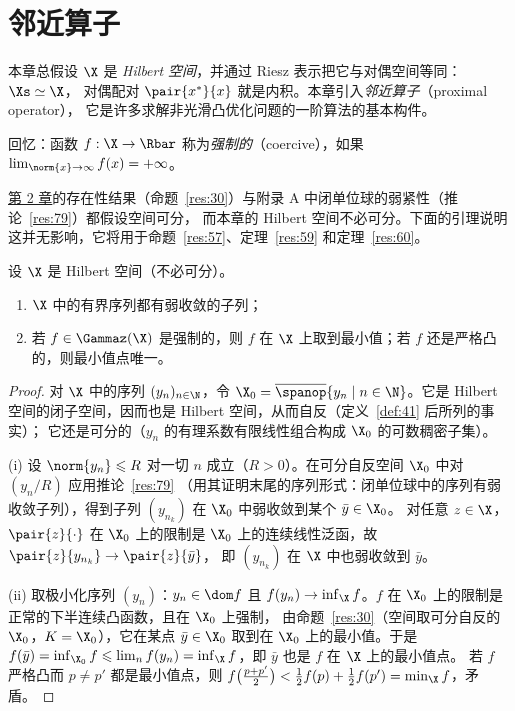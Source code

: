 \chapter{邻近算子}
\label{ch:ch04}
\providecommand{\Fix}{\operatorname{Fix}}

本章总假设 $\X$ 是 \emph{Hilbert 空间}，并通过 Riesz 表示把它与对偶空间等同：$\Xs\simeq\X$，
对偶配对 $\pair{x^*}{x}$ 就是内积。本章引入\emph{邻近算子}（proximal operator），
它是许多求解非光滑凸优化问题的一阶算法的基本构件。

回忆：函数 $f:\X\to\Rbar$ 称为\emph{强制的}（coercive），如果 $\lim_{\norm{x}\to\infty}f(x)=+\infty$。

\hyperref[ch:ch02]{第 2 章}的存在性结果（命题~\ref{res:30}）与附录 A 中闭单位球的弱紧性（推论~\ref{res:79}）都假设空间可分，
而本章的 Hilbert 空间不必可分。下面的引理说明这并无影响，它将用于命题~\ref{res:57}、定理~\ref{res:59} 和定理~\ref{res:60}。

\begin{lemma}
\label{new:ch04-nonsep}
设 $\X$ 是 Hilbert 空间（不必可分）。
\begin{enumerate}[label=(\roman*)]
  \item $\X$ 中的有界序列都有弱收敛的子列；
  \item 若 $f\in\Gammaz(\X)$ 是强制的，则 $f$ 在 $\X$ 上取到最小值；若 $f$ 还是严格凸的，则最小值点唯一。
\end{enumerate}
\end{lemma}

\begin{proof}
对 $\X$ 中的序列 $(y_n)_{n\in\N}$，令 $\X_0=\overline{\spanop}\{y_n\mid n\in\N\}$。它是 Hilbert 空间的闭子空间，因而也是 Hilbert 空间，从而自反（定义~\ref{def:41} 后所列的事实）；
它还是可分的（$y_n$ 的有理系数有限线性组合构成 $\X_0$ 的可数稠密子集）。

(i) 设 $\norm{y_n}\leqslant R$ 对一切 $n$ 成立（$R>0$）。在可分自反空间 $\X_0$ 中对 $(y_n/R)$ 应用推论~\ref{res:79}
（用其证明末尾的序列形式：闭单位球中的序列有弱收敛子列），得到子列 $(y_{n_k})$ 在 $\X_0$ 中弱收敛到某个 $\bar y\in\X_0$。
对任意 $z\in\X$，$\pair{z}{\cdot}$ 在 $\X_0$ 上的限制是 $\X_0$ 上的连续线性泛函，故 $\pair{z}{y_{n_k}}\to\pair{z}{\bar y}$，
即 $(y_{n_k})$ 在 $\X$ 中也弱收敛到 $\bar y$。

(ii) 取极小化序列 $(y_n)$：$y_n\in\dom f$ 且 $f(y_n)\to\inf_\X f$。$f$ 在 $\X_0$ 上的限制是正常的下半连续凸函数，且在 $\X_0$ 上强制，
由命题~\ref{res:30}（空间取可分自反的 $\X_0$，$K=\X_0$），它在某点 $\bar y\in\X_0$ 取到在 $\X_0$ 上的最小值。于是
$f(\bar y)=\inf_{\X_0}f\leqslant\lim_nf(y_n)=\inf_\X f$，即 $\bar y$ 也是 $f$ 在 $\X$ 上的最小值点。
若 $f$ 严格凸而 $p\neq p'$ 都是最小值点，则 $f\bigl(\frac{p+p'}2\bigr)<\frac12f(p)+\frac12f(p')=\min_\X f$，矛盾。
\end{proof}

